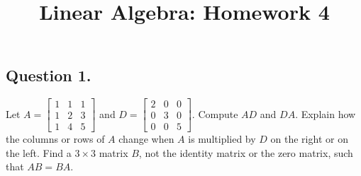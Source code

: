 \documentclass{article}
\title{Linear Algebra: Homework 4}
\begin{document}
\maketitle
\subsection*{Question 1.}
Let $A=\left[\begin{array}{ccc}1&1&1\\1&2&3\\1&4&5\end{array}\right]$ and $D=\left[\begin{array}{ccc}2&0&0\\0&3&0\\0&0&5\end{array}\right]$. Compute $AD$ and $DA$. Explain how the columns or rows of $A$ change when $A$ is multiplied by $D$ on the right or on the left. Find a $3\times 3$ matrix $B$, not the identity matrix or the zero matrix, such that $AB=BA$.
\end{document}
